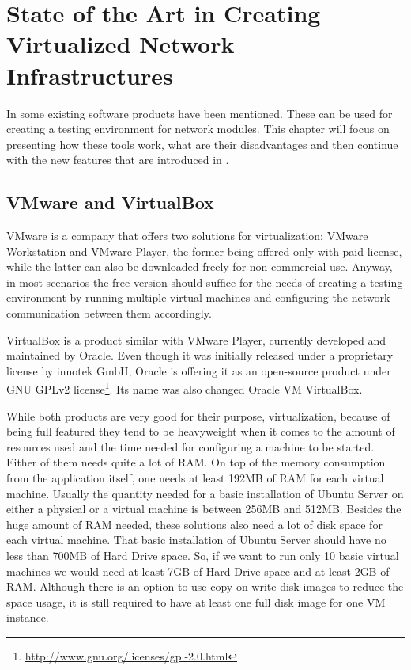 \chapter{State of the Art in Creating Virtualized Network Infrastructures}
\label{chapter:Chapter 2}

In  some existing software products have been mentioned.
These can be used for creating a testing environment for network modules.
This chapter will focus on presenting how these tools work, what are their disadvantages and then continue with the new features that are introduced in \project.

\section{VMware and VirtualBox}
\label{sec:vmw-vbox}

VMware is a company that offers two solutions for virtualization: VMware Workstation and VMware Player, the former being offered only with paid license, while the latter can also be downloaded freely for non-commercial use.
Anyway, in most scenarios the free version should suffice for the needs of creating a testing environment by running multiple virtual machines and configuring the network communication between them accordingly.

VirtualBox is a product similar with VMware Player, currently developed and maintained by Oracle.
Even though it was initially released under a proprietary license by innotek GmbH,  Oracle is offering it as an open-source product under GNU GPLv2 license\footnote{\url{http://www.gnu.org/licenses/gpl-2.0.html}}.
Its name was also changed Oracle VM VirtualBox.

While both products are very good for their purpose, virtualization, because of being full featured they tend to be heavyweight when it comes to the amount of resources used and the time needed for configuring a machine to be started.
Either of them needs quite a lot of RAM. On top of the memory consumption from the application itself, one needs at least 192MB of RAM for each virtual machine.
Usually the quantity needed for a basic installation of Ubuntu Server \cite{ubuntu-sysreq} on either a physical or a virtual machine is between 256MB and 512MB.
Besides the huge amount of RAM needed, these solutions also need a lot of disk space for each virtual machine.
That basic installation of Ubuntu Server should have no less than 700MB of Hard Drive space.
So, if we want to run only 10 basic virtual machines we would need at least 7GB of Hard Drive space and at least 2GB of RAM.
Although there is an option to use copy-on-write disk images to reduce the space usage, it is still required to have at least one full disk image for one VM instance.

